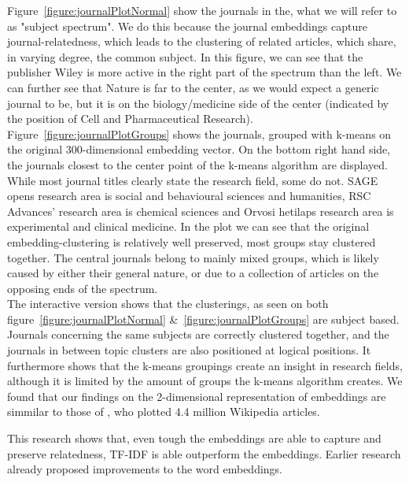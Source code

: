 \documentclass[../../Thesis.tex]{subfiles}
\begin{document}
\begin{jumpin}
Figure~\ref{figure:journalPlotNormal} show the journals in the, what we will refer to as "subject spectrum". We do this because the journal embeddings capture journal-relatedness, which leads to the clustering of related articles, which share, in varying degree, the common subject. In this figure, we can see that the publisher Wiley is more active in the right part of the spectrum than the left. We can further see that Nature is far to the center, as we would expect a generic journal to be, but it is on the biology/medicine side of the center (indicated by the position of Cell and Pharmaceutical Research).\\
Figure~\ref{figure:journalPlotGroups} shows the journals, grouped with k-means on the original 300-dimensional embedding vector. On the bottom right hand side, the journals closest to the center point of the k-means algorithm are displayed. While most journal titles clearly state the research field, some do not. SAGE opens research area is social and behavioural sciences and humanities, RSC Advances' research area is chemical sciences and Orvosi hetilaps research area is experimental and clinical medicine. In the plot we can see that the original embedding-clustering is relatively well preserved, most groups stay clustered together. The central journals belong to mainly mixed groups, which is likely caused by either their general nature, or due to a collection of articles on the opposing ends of the spectrum.\\
The interactive version shows that the clusterings, as seen on both figure~\ref{figure:journalPlotNormal} \&~\ref{figure:journalPlotGroups} are subject based. Journals concerning the same subjects are correctly clustered together, and the journals in between topic clusters are also positioned at logical positions. It furthermore shows that the k-means groupings create an insight in research fields, although it is limited by the amount of groups the k-means algorithm creates. We found that our findings on the 2-dimensional representation of embeddings are simmilar to those of \citet{dai2015document}, who plotted 4.4 million Wikipedia articles.
\end{jumpin}
This research shows that, even tough the embeddings are able to capture and preserve relatedness, TF-IDF is able outperform the embeddings. Earlier research already proposed improvements to the word embeddings.
\end{document}
